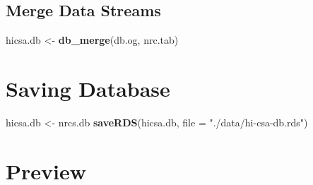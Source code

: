 \documentclass[
]{article}
\newenvironment{Shaded}{\begin{snugshade}}{\end{snugshade}}
\newcommand{\AttributeTok}[1]{\textcolor[rgb]{0.13,0.29,0.53}{#1}}
\newcommand{\FunctionTok}[1]{\textcolor[rgb]{0.13,0.29,0.53}{\textbf{#1}}}
\newcommand{\NormalTok}[1]{#1}
\newcommand{\OtherTok}[1]{\textcolor[rgb]{0.56,0.35,0.01}{#1}}
\newcommand{\StringTok}[1]{\textcolor[rgb]{0.31,0.60,0.02}{#1}}
\begin{document}
\subsection{Merge Data Streams}\label{merge-data-streams}

\begin{Shaded}
\begin{Highlighting}[]
\NormalTok{hicsa.db }\OtherTok{\textless{}{-}} \FunctionTok{db\_merge}\NormalTok{(db.og, nrc.tab)}
\end{Highlighting}
\end{Shaded}

\section{Saving Database}\label{saving-database}

\begin{Shaded}
\begin{Highlighting}[]
\NormalTok{hicsa.db }\OtherTok{\textless{}{-}}\NormalTok{ nrcs.db}
\FunctionTok{saveRDS}\NormalTok{(hicsa.db, }\AttributeTok{file =} \StringTok{"./data/hi{-}csa{-}db.rds"}\NormalTok{)}
\end{Highlighting}
\end{Shaded}

\section{Preview}\label{preview}
\end{document}

